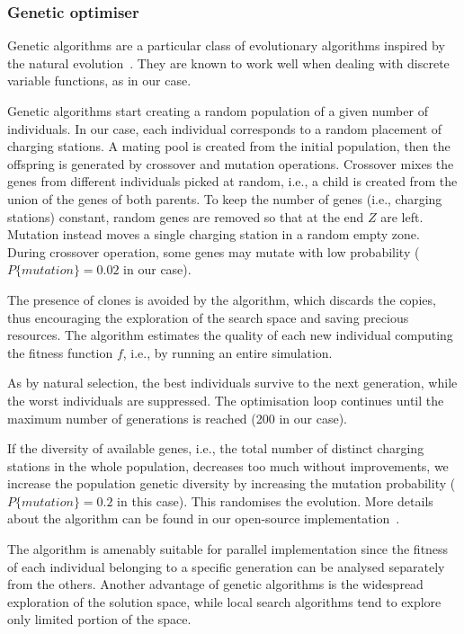 \documentclass[review, letterpaper,3p, 11pt]{elsarticle}
\begin{document}
\subsubsection{Genetic optimiser}

Genetic algorithms are a particular class of evolutionary algorithms inspired by the natural evolution~\cite{GO89}. They are known to work well when dealing with discrete variable functions, as in our case. 

Genetic algorithms start creating a random population of a given number of individuals. In our case, each individual corresponds to a random placement of charging stations. A mating pool is created from the initial population, then the offspring is generated by crossover and mutation operations. Crossover mixes the genes from different individuals picked at random, i.e., a child is created from the union of the genes of both parents. To keep the number of genes (i.e., charging stations) constant, random genes are removed so that at the end $Z$ are left.
Mutation instead moves a single charging station in a random empty zone. During crossover operation, some genes may mutate with low probability ($P\{mutation\}=0.02$ in our case).

The presence of clones is avoided by the algorithm, which discards the copies, thus encouraging the exploration of the search space and saving precious resources. The algorithm estimates the quality of each new individual computing the fitness function $f$, i.e., by running an entire simulation.

As by natural selection, the best individuals survive to the next generation, while the worst individuals are suppressed. 
The optimisation loop continues until the maximum number of generations is reached (200 in our case).

If the diversity of available genes, i.e., the total number of distinct charging stations in the whole population, decreases too much without improvements, we increase the population genetic diversity by increasing the mutation probability ($P\{mutation\}=0.2$ in this case). This randomises the evolution. More details about the algorithm can be found in our open-source implementation~\cite{MicheleGithub}.

The algorithm is amenably suitable for parallel implementation since the fitness of each individual belonging to a specific generation can be analysed separately from the others. Another advantage of genetic algorithms is the widespread exploration of the solution space, while local search algorithms tend to explore only limited portion of the space.
\end{document}
